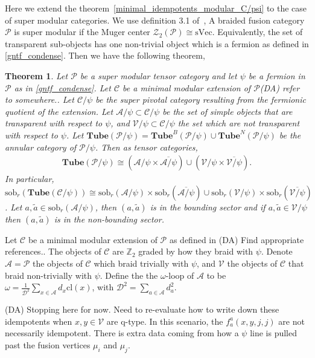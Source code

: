 \documentclass[12pt,a4paper]{article}
\newtheorem{theorem}{Theorem}[subsection]
\newcommand{\mcz}{\mathcal{Z}}
\newcommand{\mca}{\mathcal{A}}
\newcommand{\mcd}{\mathcal{D}}
\newcommand{\mcc}{\mathcal{C}}
\newcommand{\mcp}{\mathcal{P}}
\newcommand{\mcv}{\mathcal{V}}
\newcommand{\zt}{\mathbb{Z}_2}
\newcommand{\tube}{\textbf{Tube}}
\newcommand{\sob}{\text{sob}_r}
\newcommand{\dave}[1]{{\color{ao(english)}\footnotesize{(DA) #1}}}
\begin{document}
Here we extend the theorem~\ref{minimal_idempotents_modular_C/psi} to the case of super modular categories.
We use definition 3.1 of~\cite{bruillard2017},
A braided fusion category $\mcp$ is super modular if the Muger center $\mcz_2(\mcp) \cong \text{sVec}$.
Equivalently, the set of transparent sub-objects has one non-trivial object which is a fermion as defined in \ref{gntf_condense}.
Then we have the following theorem,
\begin{theorem}
Let ${\mcp}$ be a super modular tensor category and let $\psi$ be a fermion in ${\mcp}$ as in \ref{gntf_condense}.
Let $\mcc$ be a minimal modular extension of $\mcp$\dave{refer to somewhere.}.
Let $\mcc/\psi$ be the super pivotal category resulting from the fermionic quotient of the extension.
Let $\mca/\psi \subset \mcc/\psi$ be the set of simple objects that are transparent with respect to $\psi$, 
and $\mcv/\psi  \subset \mcc/\psi$ the set which are not transparent with respect to $\psi$.
Let
$
\tube(\mcp/\psi) = \tube^B(\mcp/\psi) \cup \tube^N(\mcp/\psi)
$
be the annular category of $\mcp/\psi$. 
Then as tensor categories,
\begin{align}
\tube(\mcp/\psi) \cong (\mca/\psi \times \overline{\mca/\psi}) \cup( \mcv/\psi \times \overline{\mcv/\psi}).
\end{align}
In particular, $\sob(\tube(\mcc/\psi)) \cong \sob({\mca/\psi}) \times \sob(\overline{\mca/\psi}) \cup  \sob({\mcv/\psi}) \times \sob(\overline{\mcv/\psi}) $. 
Let $a, \tilde{a} \in \sob(\mca/\psi)$, then $(a,\tilde{a})$ is in the bounding sector and if $a, \tilde{a} \in \mcv/\psi$ then $(a, \tilde{a})$ is in the non-bounding sector.
\label{minimal_idempotents_super_modular/psi}
\end{theorem}

Let $\mcc$ be a minimal modular extension of $\mcp$ as defined in \dave{Find appropriate references.}.
The objects of $\mcc$ are $\zt$ graded by how they braid with $\psi$. 
Denote $\mca = \mcp$ the objects of $\mcc$ which braid trivially with $\psi$, 
and $\mcv$ the objects of $\mcc$ that braid non-trivially with $\psi$.
Define the the $\omega$-loop of $\mca$ to be $\omega = \frac{1}{\mcd^2} \sum_{x \in \mca} d_x \text{cl}(x)$, with $\mcd^2 = \sum_{a \in \mca} d_a^2$. 

\dave{Stopping here for now.  
Need to re-evaluate how to write down these idempotents when $x,y \in \mcv$ are q-type. 
In this scenario, the $f_a^a(x,y,j,j)$ are not necessarily idempotent.
There is extra data coming from how a $\psi$ line is pulled past the fusion vertices $\mu_i$ and $\mu_j$. }
\end{document}
